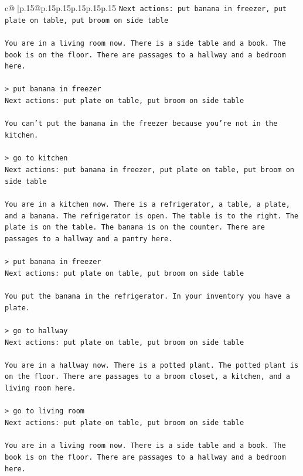 \documentclass{article}
\begin{document}
{\begin{supertabular}{c@{$\;$}|p{.15\linewidth}@{}p{.15\linewidth}p{.15\linewidth}p{.15\linewidth}p{.15\linewidth}p{.15\linewidth}}
{{{\texttt{Next actions: put banana in freezer, put plate on table, put broom on side table} \\
\\ 
\texttt{You are in a living room now. There is a side table and a book. The book is on the floor. There are passages to a hallway and a bedroom here.} \\
\\ 
\texttt{> put banana in freezer  } \\
\texttt{Next actions: put plate on table, put broom on side table} \\
\\ 
\texttt{You can't put the banana in the freezer because you're not in the kitchen.} \\
\\ 
\texttt{> go to kitchen  } \\
\texttt{Next actions: put banana in freezer, put plate on table, put broom on side table} \\
\\ 
\texttt{You are in a kitchen now. There is a refrigerator, a table, a plate, and a banana. The refrigerator is open. The table is to the right. The plate is on the table. The banana is on the counter. There are passages to a hallway and a pantry here.} \\
\\ 
\texttt{> put banana in freezer  } \\
\texttt{Next actions: put plate on table, put broom on side table} \\
\\ 
\texttt{You put the banana in the refrigerator. In your inventory you have a plate.} \\
\\ 
\texttt{> go to hallway  } \\
\texttt{Next actions: put plate on table, put broom on side table} \\
\\ 
\texttt{You are in a hallway now. There is a potted plant. The potted plant is on the floor. There are passages to a broom closet, a kitchen, and a living room here.} \\
\\ 
\texttt{> go to living room  } \\
\texttt{Next actions: put plate on table, put broom on side table} \\
\\ 
\texttt{You are in a living room now. There is a side table and a book. The book is on the floor. There are passages to a hallway and a bedroom here.} \\
}}}
\end{supertabular}}
\end{document}
